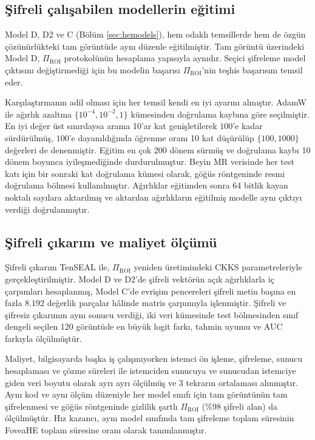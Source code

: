 \subsection{Şifreli çalışabilen modellerin eğitimi}\label{sec:fov:models}

Model D, D2 ve C (Bölüm \ref{sec:hemodels}), hem odaklı temsillerde hem de özgün çözünürlükteki tam görüntüde aynı düzenle eğitilmiştir. Tam görüntü üzerindeki Model D, $\Pi_{\mathrm{ROI}}$ protokolünün hesaplama yapısıyla aynıdır. Seçici şifreleme model çıktısını değiştirmediği için bu modelin başarısı $\Pi_{\mathrm{ROI}}$'nin teşhis başarısını temsil eder.

Karşılaştırmanın adil olması için her temsil kendi en iyi ayarını almıştır. AdamW \cite{loshchilov2019adamw} ile ağırlık azaltma $\{10^{-4}, 10^{-2}, 1\}$ kümesinden doğrulama kaybına göre seçilmiştir. En iyi değer üst sınırdaysa arama 10'ar kat genişletilerek $100$'e kadar sürdürülmüş, $100$'e dayanıldığında öğrenme oranı 10 kat düşürülüp $\{100, 1000\}$ değerleri de denenmiştir. Eğitim en çok 200 dönem sürmüş ve doğrulama kaybı 10 dönem boyunca iyileşmediğinde durdurulmuştur. Beyin MR verisinde her test katı için bir sonraki kat doğrulama kümesi olarak, göğüs röntgeninde resmi doğrulama bölmesi kullanılmıştır. Ağırlıklar eğitimden sonra 64 bitlik kayan noktalı sayılara aktarılmış ve aktarılan ağırlıkların eğitilmiş modelle aynı çıktıyı verdiği doğrulanmıştır.

\subsection{Şifreli çıkarım ve maliyet ölçümü}\label{sec:fov:cost}

Şifreli çıkarım TenSEAL ile, $\Pi_{\mathrm{ROI}}$ yeniden üretimindeki CKKS parametreleriyle gerçekleştirilmiştir. Model D ve D2'de şifreli vektörün açık ağırlıklarla iç çarpımları hesaplanmış, Model C'de evrişim pencereleri şifreli metin başına en fazla $8.192$ değerlik parçalar hâlinde matris çarpımıyla işlenmiştir. Şifreli ve şifresiz çıkarımın aynı sonucu verdiği, iki veri kümesinde test bölmesinden sınıf dengeli seçilen 120 görüntüde en büyük logit farkı, tahmin uyumu ve AUC farkıyla ölçülmüştür.

Maliyet, bilgisayarda başka iş çalışmıyorken istemci ön işleme, şifreleme, sunucu hesaplaması ve çözme süreleri ile istemciden sunucuya ve sunucudan istemciye giden veri boyutu olarak ayrı ayrı ölçülmüş ve 3 tekrarın ortalaması alınmıştır. Aynı kod ve aynı ölçüm düzeniyle her model sınıfı için tam görüntünün tam şifrelenmesi ve göğüs röntgeninde gizlilik şartlı $\Pi_{\mathrm{ROI}}$ (\%98 şifreli alan) da ölçülmüştür. Hız kazancı, aynı model sınıfında tam şifreleme toplam süresinin FoveaHE toplam süresine oranı olarak tanımlanmıştır.


